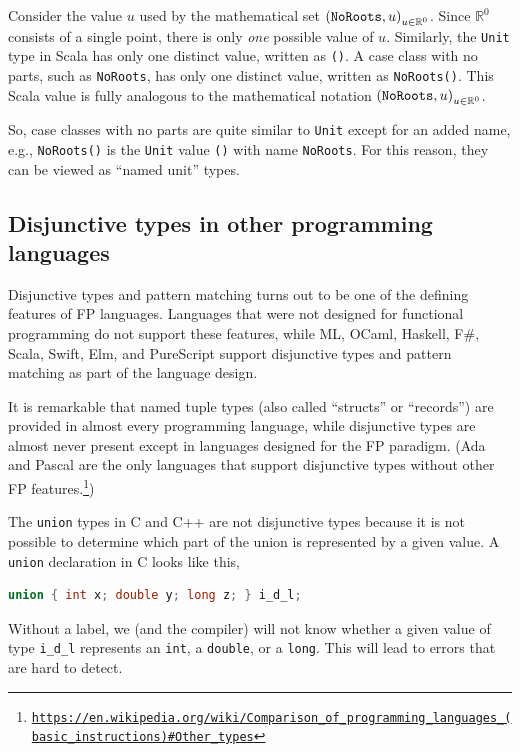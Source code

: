 Consider the value $u$ used by the mathematical set $\left(\text{\texttt{NoRoots}},u\right)_{u\in\mathbb{R}^{0}}$.
Since $\mathbb{R}^{0}$ consists of a single point, there is only
\emph{one} possible value of $u$. Similarly, the \lstinline!Unit!
type in Scala has only one distinct value, written as \lstinline!()!.
A case class with no parts, such as \lstinline!NoRoots!, has only
one distinct value, written as \lstinline!NoRoots()!. This Scala
value is fully analogous to the mathematical notation $\left(\text{\texttt{NoRoots}},u\right)_{u\in\mathbb{R}^{0}}$.

So, case classes with no parts are quite similar to \lstinline!Unit!
except for an added name, e.g., \lstinline!NoRoots()! is the \lstinline!Unit!
value \lstinline!()! with name \lstinline!NoRoots!. For this reason,
they can be viewed as ``named unit'' types.

\subsection{Disjunctive types in other programming languages}

Disjunctive types and pattern matching turns out to be one of the
defining features of FP languages. Languages that were not designed
for functional programming do not support these features, while ML,
OCaml, Haskell, F\#, Scala, Swift, Elm, and PureScript support disjunctive
types and pattern matching as part of the language design. 

It is remarkable that named tuple types (also called ``structs''
or ``records'') are provided in almost every programming language,
while disjunctive types are almost never present except in languages
designed for the FP paradigm. (Ada and Pascal are the only languages
that support disjunctive types without other FP features.\footnote{\texttt{\href{https://en.wikipedia.org/wiki/Comparison_of_programming_languages_(basic_instructions)\#Other_types}{https://en.wikipedia.org/wiki/Comparison\_of\_programming\_languages\_(basic\_instructions)\#Other\_types}}})

The \lstinline!union! types in C and C++ are not disjunctive types
because it is not possible to determine which part of the union is
represented by a given value. A \lstinline!union! declaration in
C looks like this,
\begin{lstlisting}[language=C]
union { int x; double y; long z; } i_d_l;
\end{lstlisting}
Without a label, we (and the compiler) will not know whether a given
value of type \lstinline!i_d_l! represents an \lstinline!int!, a
\lstinline!double!, or a \lstinline!long!. This will lead to errors
that are hard to detect.

